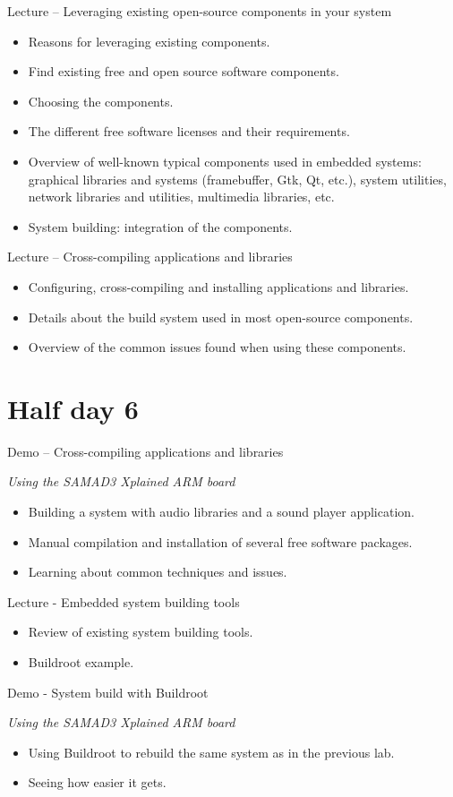 \documentclass[a4paper,12pt,obeyspaces,spaces,hyphens]{article}
\begin{document}
\feagendatwocolumn
{Lecture – Leveraging existing open-source components in your system}
{
  \begin{itemize}
  \item Reasons for leveraging existing components.
  \item Find existing free and open source software components.
  \item Choosing the components.
  \item The different free software licenses and their requirements.
  \item Overview of well-known typical components used in
        embedded systems: graphical libraries and systems
        (framebuffer, Gtk, Qt, etc.), system utilities,
        network libraries and utilities, multimedia libraries, etc.
  \item System building: integration of the components.
  \end{itemize}
}
{Lecture – Cross-compiling applications and libraries}
{
  \begin{itemize}
  \item Configuring, cross-compiling and installing applications and libraries.
  \item Details about the build system used in most open-source components.
  \item Overview of the common issues found when using these components.
  \end{itemize}
}

\section{Half day 6}

\feagendaonecolumn
{Demo – Cross-compiling applications and libraries}
{
  {\em Using the SAMAD3 Xplained ARM board}
  \begin{itemize}
  \item Building a system with audio libraries and a sound player application.
  \item Manual compilation and installation of several free software packages.
  \item Learning about common techniques and issues.
  \end{itemize}
}

\feagendatwocolumn
{Lecture - Embedded system building tools}
{
  \begin{itemize}
  \item Review of existing system building tools.
  \item Buildroot example.
  \end{itemize}
}
{Demo - System build with Buildroot}
{
  {\em Using the SAMAD3 Xplained ARM board}
  \begin{itemize}
  \item Using Buildroot to rebuild the same system as in the previous lab.
  \item Seeing how easier it gets.
  \end{itemize}
}
\end{document}
